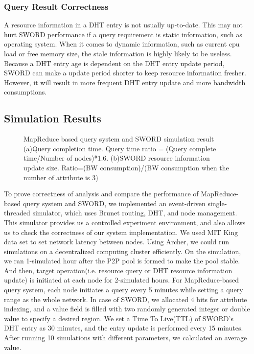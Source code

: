 \documentclass{acm_proc_article-sp}
\begin{document}
\subsubsection{Query Result Correctness}
A resource information in a DHT entry is not usually up-to-date. This may not hurt SWORD performance if a query requirement is static information, such as operating system. 
When it comes to dynamic information, such as current cpu load or free memory size, the stale information is highly likely to be useless. 
Because a DHT entry age is dependent on the DHT entry update period, SWORD can make a update period shorter to keep resource information fresher.
However, it will result in more frequent DHT entry update and more bandwidth consumptions.
\subsection{Simulation Results}
\begin{figure}[t]
\centering
{}
\caption{MapReduce based query system and SWORD simulation result (a)Query completion time. Query time ratio = (Query complete time/Number of nodes)*1.6. 
(b)SWORD resource information update size. Ratio=(BW consumption)/(BW consumption when the number of attribute is 3)}
\end{figure}
To prove correctness of analysis and compare the performance of MapReduce-based query system and SWORD, we implemented an event-driven single-threaded simulator, which uses Brunet\cite{brunet} routing, DHT, and node management.
This simulator provides us a controlled experiment environment, and also allows us to check the correctness of our system implementation. We used MIT King data set\cite{king} to set network latency between nodes.
Using Archer\cite{archer}, we could run simulations on a decentralized computing cluster efficiently. 
On the simulation, we ran 1-simulated hour after the P2P pool is formed to make the pool stable. And then, target operation(i.e. resource query or DHT resource information update) is initiated at each node for 2-simulated hours.
For MapReduce-based query system, each node initiates a query every 5 minutes while setting a query range as the whole network. 
In case of SWORD, we allocated 4 bits for attribute indexing, and a value field is filled with two randomly generated integer or double value to specify a desired region. 
We set a Time To Live(TTL) of SWORD's DHT entry as 30 minutes, and the entry update is performed every 15 minutes.
After running 10 simulations with different parameters, we calculated an average value.
\end{document}
